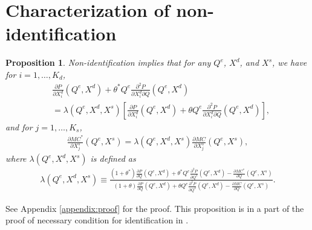 \documentclass[11pt, a4paper]{article}
\newtheorem{proposition}{Proposition}
\theoremstyle{remark}
\begin{document}
\section{Characterization of non-identification}\label{sec:non-identification_characterization}





\begin{proposition}\label{proposition:non-identification_charaterization}
    Non-identification implies that for any $Q^e$, $X^{d}$, and $X^{s}$, we have for $i = 1, \ldots, K_d$,
    \begin{align}
        &\frac{\partial P}{\partial X^{d}_{i}}(Q^e, X^{d}) + \theta^{*} Q^e \frac{\partial^2 P}{\partial X^{d}_{i}\partial Q}(Q^e, X^{d})\\  
        &= \lambda(Q^e, X^{d}, X^{s})\left[ \frac{\partial P}{\partial X^{d}_{i}}(Q^e, X^{d}) + \theta Q^e \frac{\partial^2 P}{\partial X^{d}_{i}\partial Q}(Q^e, X^{d}) \right], \label{eq:nonidentification_demand}
    \end{align}
    and for $j = 1,\ldots, K_s$,
    \begin{align}
        \frac{\partial MC^{*}}{\partial X^{s}_j}(Q^e, X^{s}) = \lambda(Q^e, X^{d}, X^{s}) \frac{\partial MC}{\partial X^{s}_j}(Q^e, X^{s}),\label{eq:nonidentification_marginal_cost}
    \end{align}
    where $\lambda(Q^e, X^{d}, X^{s})$ is defined as
    \begin{align}
        \lambda(Q^e, X^{d}, X^{s}) \equiv \frac{(1+\theta^{*})\frac{\partial P}{\partial Q}(Q^e, X^{d}) + \theta^{*} Q^e\frac{\partial^2 P}{\partial Q^2}(Q^e, X^{d}) - \frac{\partial MC^{*}}{\partial Q}(Q^e, X^{s})}{(1+\theta)\frac{\partial P}{\partial Q}(Q^e, X^{d}) + \theta Q^e\frac{\partial^2 P}{\partial Q^2}(Q^e, X^{d}) - \frac{\partial MC}{\partial Q}(Q^e, X^{s})}. \label{eq:lambda_foc}
    \end{align}
\end{proposition}

See Appendix \ref{appendix:proof} for the proof.
This proposition is in a part of the proof of necessary condition for identification in \citet{lau1982identifying}.
\end{document}
